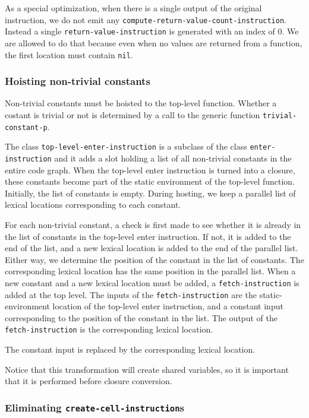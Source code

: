 As a special optimization, when there is a single output of the
original instruction, we do not emit any
\texttt{compute-return-value-count-instruction}.  Instead a single
\texttt{return-value-instruction} is generated with an index of $0$.
We are allowed to do that because even when no values are returned
from a function, the first location must contain \texttt{nil}.

\subsubsection{Hoisting non-trivial constants}

Non-trivial constants must be hoisted to the top-level function.
Whether a costant is trivial or not is determined by a call to the
generic function \texttt{trivial-constant-p}.

The class \texttt{top-level-enter-instruction} is a subclass of the
class \texttt{enter-instruction} and it adds a slot holding a list of
all non-trivial constants in the entire code graph.  When the
top-level enter instruction is turned into a closure, these constants
become part of the static environment of the top-level function.
Initially, the list of constants is empty.  During hosting, we keep a
parallel list of lexical locations corresponding to each constant.

For each non-trivial constant, a check is first made to see whether it
is already in the list of constants in the top-level enter
instruction.  If not, it is added to the end of the list, and a new
lexical location is added to the end of the parallel list.  Either
way, we determine the position of the constant in the list of
constants.  The corresponding lexical location has the same position
in the parallel list.  When a new constant and a new lexical location
must be added, a \texttt{fetch-instruction} is added at the top level.
The inputs of the \texttt{fetch-instruction} are the
static-environment location of the top-level enter instruction, and a
constant input corresponding to the position of the constant in the
list.  The output of the \texttt{fetch-instruction} is the
corresponding lexical location.

The constant input is replaced by the corresponding lexical location.

Notice that this transformation will create shared variables, so it is
important that it is performed before closure conversion.

\subsubsection{Eliminating \texttt{create-cell-instruction}s}

